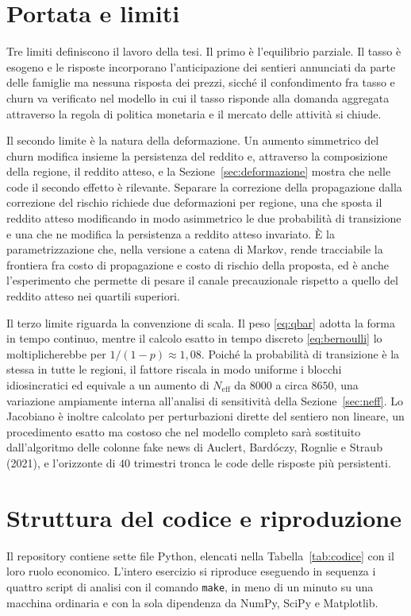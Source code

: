 \documentclass[11pt,a4paper]{article}
\newcommand{\Neff}{N_{\mathrm{eff}}}
\begin{document}
\section{Portata e limiti}\label{sec:limiti}
Tre limiti definiscono il lavoro della tesi. Il primo è l'equilibrio parziale. Il tasso è esogeno e le risposte incorporano l'anticipazione dei sentieri annunciati da parte delle famiglie ma nessuna risposta dei prezzi, sicché il confondimento fra tasso e churn va verificato nel modello in cui il tasso risponde alla domanda aggregata attraverso la regola di politica monetaria e il mercato delle attività si chiude.

Il secondo limite è la natura della deformazione. Un aumento simmetrico del churn modifica insieme la persistenza del reddito e, attraverso la composizione della regione, il reddito atteso, e la Sezione~\ref{sec:deformazione} mostra che nelle code il secondo effetto è rilevante. Separare la correzione della propagazione dalla correzione del rischio richiede due deformazioni per regione, una che sposta il reddito atteso modificando in modo asimmetrico le due probabilità di transizione e una che ne modifica la persistenza a reddito atteso invariato. È la parametrizzazione che, nella versione a catena di Markov, rende tracciabile la frontiera fra costo di propagazione e costo di rischio della proposta, ed è anche l'esperimento che permette di pesare il canale precauzionale rispetto a quello del reddito atteso nei quartili superiori.

Il terzo limite riguarda la convenzione di scala. Il peso \eqref{eq:qbar} adotta la forma in tempo continuo, mentre il calcolo esatto in tempo discreto \eqref{eq:bernoulli} lo moltiplicherebbe per $1/(1-p)\approx1{,}08$. Poiché la probabilità di transizione è la stessa in tutte le regioni, il fattore riscala in modo uniforme i blocchi idiosincratici ed equivale a un aumento di $\Neff$ da $8000$ a circa $8650$, una variazione ampiamente interna all'analisi di sensitività della Sezione~\ref{sec:neff}. Lo Jacobiano è inoltre calcolato per perturbazioni dirette del sentiero non lineare, un procedimento esatto ma costoso che nel modello completo sarà sostituito dall'algoritmo delle colonne fake news di Auclert, Bardóczy, Rognlie e Straub (2021), e l'orizzonte di $40$ trimestri tronca le code delle risposte più persistenti.

\section{Struttura del codice e riproduzione}\label{sec:codice}
Il repository contiene sette file Python, elencati nella Tabella~\ref{tab:codice} con il loro ruolo economico. L'intero esercizio si riproduce eseguendo in sequenza i quattro script di analisi con il comando \texttt{make}, in meno di un minuto su una macchina ordinaria e con la sola dipendenza da NumPy, SciPy e Matplotlib.
\end{document}
